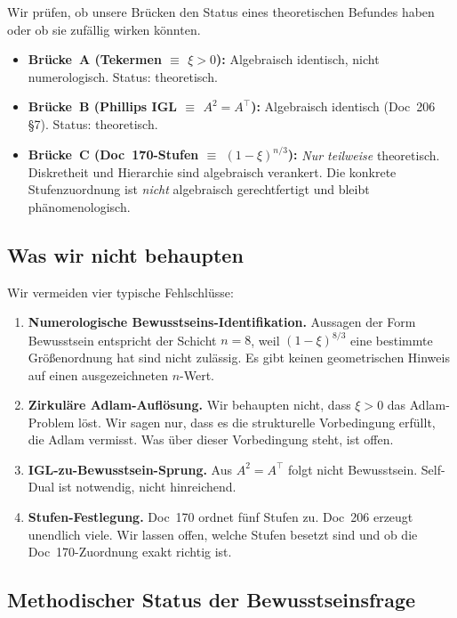 Wir prüfen, ob unsere Brücken den Status eines theoretischen Befundes haben oder ob sie zufällig wirken könnten.

\begin{itemize}
\item \textbf{Brücke~A (Tekermen $\equiv$ $\xi > 0$):} Algebraisch identisch, nicht numerologisch. Status: theoretisch.
\item \textbf{Brücke~B (Phillips IGL $\equiv$ $A^2 = A^\top$):} Algebraisch identisch (Doc~206 \S7). Status: theoretisch.
\item \textbf{Brücke~C (Doc~170-Stufen $\equiv$ $(1-\xi)^{n/3}$):} \emph{Nur teilweise} theoretisch. Diskretheit und Hierarchie sind algebraisch verankert. Die konkrete Stufenzuordnung ist \emph{nicht} algebraisch gerechtfertigt und bleibt phänomenologisch.
\end{itemize}

\subsection{Was wir nicht behaupten}

Wir vermeiden vier typische Fehlschlüsse:

\begin{enumerate}
\item \textbf{Numerologische Bewusstseins-Identifikation.} Aussagen der Form \glqq Bewusstsein entspricht der Schicht $n = 8$, weil $(1-\xi)^{8/3}$ eine bestimmte Größenordnung hat\grqq{} sind nicht zulässig. Es gibt keinen geometrischen Hinweis auf einen ausgezeichneten $n$-Wert.
\item \textbf{Zirkuläre Adlam-Auflösung.} Wir behaupten nicht, dass $\xi > 0$ das Adlam-Problem \glqq löst\grqq{}. Wir sagen nur, dass es die strukturelle Vorbedingung erfüllt, die Adlam vermisst. Was über dieser Vorbedingung steht, ist offen.
\item \textbf{IGL-zu-Bewusstsein-Sprung.} Aus $A^2 = A^\top$ folgt nicht Bewusstsein. Self-Dual ist notwendig, nicht hinreichend.
\item \textbf{Stufen-Festlegung.} Doc~170 ordnet fünf Stufen zu. Doc~206 erzeugt unendlich viele. Wir lassen offen, welche Stufen \glqq besetzt\grqq{} sind und ob die Doc~170-Zuordnung exakt richtig ist.
\end{enumerate}

\subsection{Methodischer Status der Bewusstseinsfrage}

